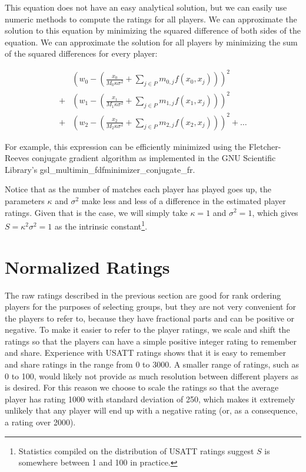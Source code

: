 \documentclass{article}
\begin{document}
This equation does not have an easy analytical solution, but we can easily use
numeric methods to compute the ratings for all players. We can approximate the
solution to this equation by minimizing the squared difference of both sides
of the equation. We can approximate the solution for all players by minimizing
the sum of the squared differences for every player:

\begin{align*}
    &(w_0 - (\frac{x_0}{M_0 \kappa \sigma^2} + \sum_{j \in P} m_{0, j} f(x_0, x_j)))^2 \\
  + &(w_1 - (\frac{x_1}{M_1 \kappa \sigma^2} + \sum_{j \in P} m_{1, j} f(x_1, x_j)))^2 \\
  + &(w_2 - (\frac{x_2}{M_2 \kappa \sigma^2} + \sum_{j \in P} m_{2, j} f(x_2, x_j)))^2 + \ldots
\end{align*}

For example, this expression can be efficiently minimized using the
Fletcher-Reeves conjugate gradient algorithm as implemented in the GNU
Scientific Library's gsl\_multimin\_fdfminimizer\_conjugate\_fr.

Notice that as the number of matches each player has played goes up, the
parameters $\kappa$ and $\sigma^2$ make less and less of a difference in the
estimated player ratings. Given that is the case, we will simply take $\kappa = 1$
and $\sigma^2 = 1$, which gives $S = \kappa^2 \sigma^2 = 1$ as the intrinsic
constant\footnote{Statistics compiled on the distribution of USATT ratings
  suggest $S$ is somewhere between 1 and 100 in practice.}.

\section{Normalized Ratings}
The raw ratings described in the previous section are good for rank ordering
players for the purposes of selecting groups, but they are not very convenient
for the players to refer to, because they have fractional parts and can be
positive or negative. To make it easier to refer to the player ratings, we
scale and shift the ratings so that the players can have a simple positive
integer rating to remember and share. Experience with USATT ratings shows that
it is easy to remember and share ratings in the range from 0 to 3000. A
smaller range of ratings, such as 0 to 100, would likely not provide as much
resolution between different players as is desired. For this reason we choose
to scale the ratings so that the average player has rating 1000 with standard
deviation of 250, which makes it extremely unlikely that any player will end
up with a negative rating (or, as a consequence, a rating over 2000).
\end{document}
